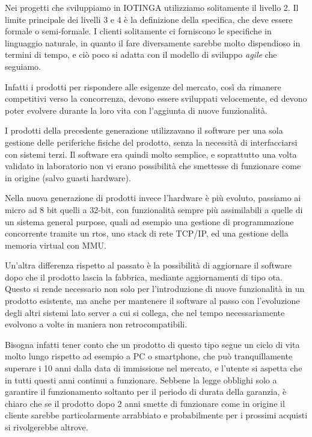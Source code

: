 \documentclass[12pt,a4paper,twoside,titlepage]{book}
\begin{document}
Nei progetti che sviluppiamo in IOTINGA utilizziamo solitamente il livello 2. 
Il limite principale dei livelli 3 e 4 è la definizione della specifica, che 
deve essere formale o semi-formale. I clienti solitamente ci forniscono le specifiche in linguaggio 
naturale, in quanto il fare diversamente sarebbe molto dispendioso in termini di tempo, 
e ciò poco si adatta con il modello di sviluppo \textit{agile} che seguiamo. 

Infatti i prodotti per rispondere alle esigenze del mercato, così da rimanere 
competitivi verso la concorrenza, devono essere sviluppati velocemente, ed devono poter 
evolvere durante la loro vita con l'aggiunta di nuove funzionalità. 

I prodotti della precedente generazione utilizzavano il software per una sola gestione
delle periferiche fisiche del prodotto, senza la necessità di interfacciarsi con sistemi
terzi. Il software era quindi molto semplice, e soprattutto una volta validato in laboratorio 
non vi erano possibilità che smettesse di funzionare come in origine (salvo guasti hardware). 

Nella nuova generazione di prodotti invece l'hardware è più evoluto, passiamo ai \gls{micro} 
ad 8 bit quelli a 32-bit, con funzionalità sempre più assimilabili a quelle di un sistema
general purpose, quali ad esempio una gestione di programmazione concorrente tramite un \acrfull{rtos}, uno
stack di rete TCP/IP, ed una gestione della memoria virtual con MMU.

Un'altra differenza rispetto al passato è la possibilità di aggiornare il software dopo
che il prodotto lascia la fabbrica, mediante aggiornamenti di tipo \acrfull{ota}.
Questo si rende necessario non solo per l'introduzione di nuove funzionalità in
un prodotto esistente, ma anche per mantenere il software al passo con l'evoluzione degli
altri sistemi lato server a cui si collega, che nel tempo necessariamente evolvono a volte 
in maniera non retrocompatibili.

Bisogna infatti tener conto che un prodotto di questo tipo segue un ciclo di vita molto lungo
rispetto ad esempio a PC o smartphone, che può tranquillamente superare i 10 anni dalla data di
immissione nel mercato, e l'utente si aspetta che in tutti questi anni continui a funzionare. 
Sebbene la legge obblighi solo a garantire il funzionamento soltanto per il periodo di durata 
della garanzia, è chiaro che se il prodotto dopo 2 anni smette di funzionare come in origine 
il cliente sarebbe particolarmente arrabbiato e probabilmente per i prossimi acquisti si rivolgerebbe altrove. 
\end{document}
